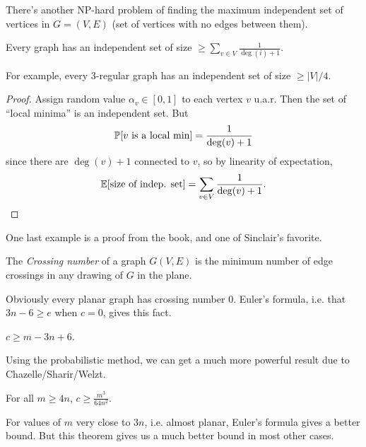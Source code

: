 \documentclass[11 pt]{scrartcl}
\begin{document}
There's another NP-hard problem of finding the maximum independent set of vertices in $G = (V,E)$ (set of vertices with no edges between them).  
\begin{theorem}
    Every graph has an independent set of size $\geq \sum_{v\in V} \frac{1}{\deg(i) + 1}$. 
\end{theorem}
For example, every 3-regular graph has an independent set of size $\geq |V|/4$.
\begin{proof}
    Assign random value $\alpha_v \in [0, 1]$ to each vertex $v$ u.a.r. Then the set of ``local minima'' is an independent set. But 
    \[ \mathbb P[v \text{ is a local min}]  = \dfrac{1}{\deg(v) + 1}\] 
    since there are $\deg(v) + 1$ connected to $v$, so by linearity of expectation, 
    \[ \mathbb E[\text{size of indep. set}] = \sum_{v \in V} \dfrac{1}{\deg(v) + 1}.\] 
\end{proof}

One last example is a proof from the book, and one of Sinclair's favorite. 

\begin{definition}
    The \emph{Crossing number} of a graph $G(V, E)$ is the minimum number of edge crossings in any drawing of $G$ in the plane. 
\end{definition}

Obviously every planar graph has crossing number $0$. Euler's formula, i.e. that $3n-6 \geq e$ when $c = 0$, gives this fact.
\begin{fact}
    $c \geq m - 3n + 6$.  
\end{fact}

Using the probabilistic method, we can get a much more powerful result due to Chazelle/Sharir/Welzt.  

\begin{theorem}
    For all $m \geq 4n$, $c \geq \frac{m^3}{64 n^2}.$ 
\end{theorem}
For values of $m$ very close to $3n$, i.e. almost planar, Euler's formula gives a better bound. But this theorem gives us a much better bound in most other cases. 
\end{document}
